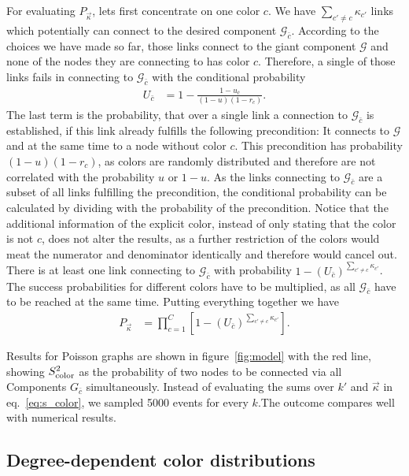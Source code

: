 \documentclass[aps, pre, onecolumn, a4paper, floatfix]{revtex4}
\begin{document}
For evaluating $P_{\vec \kappa}$, lets first concentrate on one color $c$. We have 
$\sum_{c'\neq c}\kappa_{c'}$ links which potentially can connect to the desired component ${\mathcal G}_{\bar c}$. 
According to the choices we have made so far, those links connect to the giant component 
${\mathcal G}$ and none of the nodes they are connecting to has color $c$. Therefore, a single 
of those links fails in connecting to ${\mathcal G}_{\bar c}$ with the conditional probability 
\begin{align}
U_{\bar c} &= 1 - \frac{1-u_{\bar c}}{(1-u)(1-r_c)}.\label{eq:U_c}
\end{align}
The last term is the probability, that over a single link a connection to ${\mathcal G}_{\bar c}$
is established, if this link already fulfills the following precondition: 
It connects to ${\mathcal G}$ and at the same time to a node without color $c$. 
This precondition has probability $(1-u)(1-r_c)$, as colors are randomly distributed and therefore 
are not correlated with the probability $u$ or $1-u$. As the links connecting to ${\mathcal G}_{\bar c}$ 
are a subset of all links fulfilling the precondition, the conditional probability can be 
calculated by dividing with the probability of the precondition. 
Notice that the additional information of the explicit color, instead of only stating that the color 
is not $c$, does not alter the results, as a further restriction of the colors 
would meat the numerator and denominator identically and therefore would cancel out. 
There is at least one link connecting to ${\mathcal G}_{\bar c}$ with probability 
$1-(U_{\bar c})^{\sum_{c'\neq c} \kappa_{c'} }$. The success probabilities for different colors have to be 
multiplied, as all ${\mathcal G}_{\bar c}$ have to be reached at the same time. 
Putting everything together we have 
%
\begin{align}
P_{\vec \kappa} &= \prod_{c=1}^C [1-(U_{\bar c})^{\sum_{c'\neq c} \kappa_{c'} }].\label{eq:p_success}
\end{align}

Results for Poisson graphs are shown in figure~\ref{fig:model} with the red line, showing 
$S_{\rm color}^2$ as the probability of two nodes to be connected via all Components 
$G_{\bar c}$ simultaneously. Instead of evaluating the sums over $k'$ and $\vec \kappa$ 
in eq.~\ref{eq:s_color}, we sampled 5000 events for every $k$.The outcome compares well with 
numerical results. 


\subsection{Degree-dependent color distributions}\label{subsec:degree}
\end{document}
